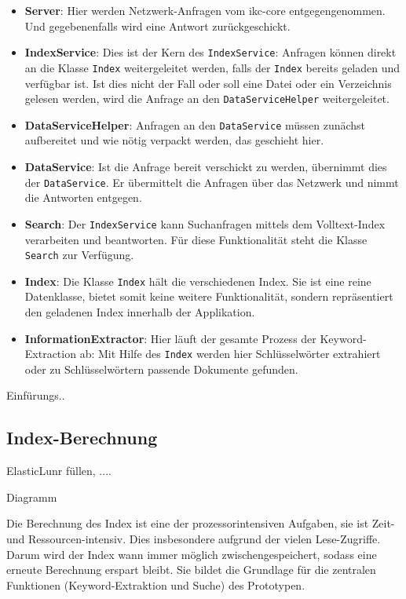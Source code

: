 \begin{itemize}
    \item \textbf{Server}: Hier werden Netzwerk-Anfragen vom \gls{ikc-core} entgegengenommen. Und gegebenenfalls wird eine Antwort zu\-rück\-ge\-schi\-ckt.
    \item \textbf{IndexService}: Dies ist der Kern des \texttt{IndexService}: Anfragen können direkt an die Klasse \texttt{Index} weitergeleitet werden, falls der \texttt{Index} bereits geladen und verfügbar ist. Ist dies nicht der Fall oder soll eine Datei oder ein Verzeichnis gelesen werden, wird die Anfrage an den \texttt{DataServiceHelper} weitergeleitet.
    \item \textbf{DataServiceHelper}: Anfragen an den \texttt{DataService} müssen zu\-nä\-chst aufbereitet und wie nötig verpackt werden, das geschieht hier.
    \item \textbf{DataService}: Ist die Anfrage bereit verschickt zu werden, üb\-er\-ni\-mmt dies der \texttt{DataService}. Er übermittelt die Anfragen über das Netzwerk und nimmt die Antworten entgegen.
    \item \textbf{Search}: Der \texttt{IndexService} kann Suchanfragen mittels dem Voll\-te\-xt-Index verarbeiten und beantworten. Für diese Funktionalität steht die Klasse \texttt{Search} zur Verfügung.
    \item \textbf{Index}: Die Klasse \texttt{Index} hält die verschiedenen Index. Sie ist eine reine Datenklasse, bietet somit keine weitere Funktionalität, sondern repräsentiert den geladenen Index innerhalb der Applikation.
    \item \textbf{InformationExtractor}: Hier läuft der gesamte Prozess der Key\-wo\-rd-\-Ex\-trac\-ti\-on ab: Mit Hilfe des \texttt{Index} werden hier Schlüs\-sel\-wör\-ter extrahiert oder zu Schlü\-ssel\-wör\-tern passende Dokumente gefunden.
\end{itemize}




Einfürungs..

\subsection{Index-Berechnung}

ElasticLunr füllen, ....

Diagramm

Die Berechnung des Index ist eine der prozessorintensiven Aufgaben, sie ist Zeit- und Ressourcen-intensiv. Dies insbesondere aufgrund der vielen Lese-Zugriffe. Darum wird der Index wann immer möglich zwischengespeichert, sodass eine erneute Berechnung erspart bleibt. Sie bildet die Grundlage für die zentralen Funktionen (\gls{Keyword}-Ex\-trak\-tion und Suche) des Prototypen.


